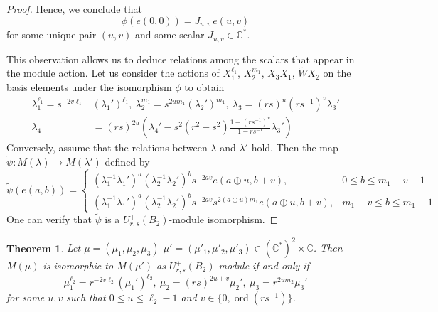 \documentclass[12 pt,reqno]{amsart}
\numberwithin{equation}{section}
\DeclareMathOperator{\ord}{ord}
\newtheorem{theorem}[thm]{Theorem}
\theoremstyle{definition}
\theoremstyle{definition}
\theoremstyle{remark}
\theoremstyle{remark}
\begin{document}
\begin{proof}
\noindent Hence, we conclude that
\[
\phi(e{(0,0)}) = J_{u,v} \, e{(u,v)}
\]
for some unique pair $(u,v)$ and some scalar $J_{u,v} \in \mathbb{C}^*$.

\noindent This observation allows us to deduce relations among the scalars that appear in the module action. Let us consider the actions of $X_1^{\ell_1}$, $X_2^{m_1}$, $X_3X_1$, $\tilde{W}X_2$ on the basis elements under the isomorphism $\phi$ to obtain
\begin{align*}
    \lambda_1^{\ell_1}=s^{-2v\ell_1}&(\lambda_1')^{\ell_1}, \ \lambda_2^{m_1}=s^{2um_1}(\lambda_2')^{m_1}, \ \lambda_3=(rs)^u(rs^{-1})^v\lambda_3'\\
    \lambda_4&=(rs)^{2u}\left(\lambda_4'-s^2(r^2-s^2)\displaystyle\frac{1-(rs^{-1})^v}{1-rs^{-1}}\lambda_3'\right)
\end{align*}
Conversely, assume that the relations between $\lambda$ and $\lambda'$ hold. Then the map $\tilde{\psi}:M(\lambda)\rightarrow M(\lambda')$ defined by
\[\tilde{\psi}\left(e(a,b)\right)=\begin{cases}
(\lambda_1^{-1}\lambda_1')^a(\lambda_2^{-1}\lambda_2')^bs^{-2av}e(a\oplus u,b+v), & 0 \leq b \leq m_1-v-1\\
(\lambda_1^{-1}\lambda_1')^a(\lambda_2^{-1}\lambda_2')^bs^{-2av}s^{2(a \oplus u)m_1}e(a\oplus u,b+v), & m_1-v \leq b \leq m_1-1   
\end{cases}\]
One can verify that $\tilde{\psi}$ is a $U_{r,s}^+(B_2)$-module isomorphism.
\end{proof}
\begin{theorem}\label{2ndIso}
    Let $\mu=(\mu_1,\mu_2,\mu_3)$ $\mu'=(\mu'_1,\mu'_2,\mu'_3)\in (\mathbb{C}^*)^2 \times \mathbb{C}$. Then $M(\mu)$ is isomorphic to $M(\mu')$ as $U_{r,s}^+(B_2)$-module if and only if 
\[\mu_1^{\ell_2}=r^{-2v\ell_2}(\mu_1')^{\ell_2},\ \mu_2=(rs)^{2u+v}\mu_2',\ \mu_3=r^{2um_2}\mu_3'\] for some $u,v$ such that $0 \leq u \leq \ell_2-1$ and $v\in\{0,\ord(rs^{-1})\}$.
\end{theorem}
\end{document}

